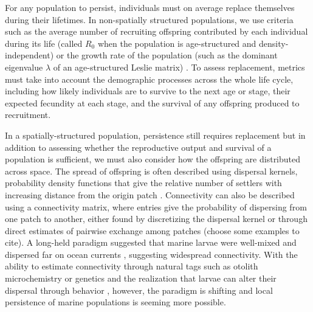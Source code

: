 \documentclass[12pt, oneside]{article}   	%
\begin{document}
For any population to persist, individuals must on average replace themselves during their lifetimes. In non-spatially structured populations, we use criteria such as the average number of recruiting offspring contributed by each individual during its life (called $R_0$ when the population is age-structured and density-independent) or the growth rate of the population (such as the dominant eigenvalue $\lambda$ of an age-structured Leslie matrix) \citep{caswell_matrix_2001, burgess2014beyond}. To assess replacement, metrics must take into account the demographic processes across the whole life cycle, including how likely individuals are to survive to the next age or stage, their expected fecundity at each stage, and the survival of any offspring produced to recruitment. 

In a spatially-structured population, persistence still requires replacement but in addition to assessing whether the reproductive output and survival of a population is sufficient, we must also consider how the offspring are distributed across space. The spread of offspring is often described using dispersal kernels, probability density functions that give the relative number of settlers with increasing distance from the origin patch \citep[e.g.][]{bode2018estimating}. Connectivity can also be described using a connectivity matrix, where entries give the probability of dispersing from one patch to another, either found by discretizing the dispersal kernel or through direct estimates of pairwise exchange among patches (choose some examples to cite). A long-held paradigm suggested that marine larvae were well-mixed and dispersed far on ocean currents \citep{roughgarden_recruitment_1988}, suggesting widespread connectivity. With the ability to estimate connectivity through natural tags such as otolith microchemistry or genetics and the realization that larvae can alter their dispersal through behavior \citep[e.g.][]{morgan_nearshore_2009}, however, the paradigm is shifting and local persistence of marine populations is seeming more possible. 
\end{document}
